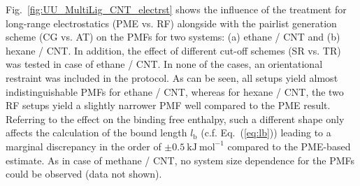 \documentclass[9pt,lessons]{livecoms}
\begin{document}
Fig.~\ref{fig:UU_MultiLig_CNT_electrst} shows the influence of the treatment for long-range electrostatics (PME vs. RF) alongside with the pairlist generation scheme (CG vs. AT) on the PMFs for two systems: 
(a) ethane / CNT and (b) hexane / CNT. 
In addition, the effect of different cut-off schemes (SR vs. TR) was tested in case of ethane / CNT.
In none of the cases, an orientational restraint was included in the protocol. 
As can be seen, all setups yield almost indistinguishable PMFs for ethane / CNT, whereas for hexane / CNT, the two RF setups yield a slightly narrower PMF well compared to the PME result. 
Referring to the effect on the binding free enthalpy, such a different shape only affects the calculation of the bound length $l_\mathrm{b}$ (c.f. Eq.~(\ref{eq:lb})) leading to a marginal 
discrepancy in the order of $\pm 0.5~\mathrm{kJ}~\mathrm{mol}^{-1}$ compared to the PME-based estimate.
As in case of methane / CNT, no system size dependence for the PMFs could be observed (data not shown).
\end{document}
